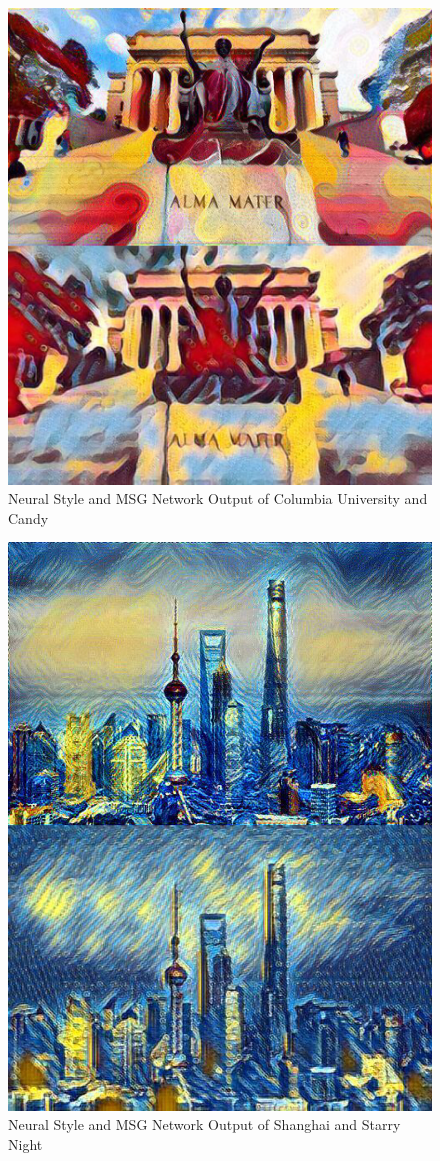 \documentclass[10pt,twocolumn,letterpaper]{article}
\begin{document}
\begin{figure}[t]
\begin{center}
\includegraphics[width=0.6\linewidth]{images/col_cmp.jpg}
\end{center}
\caption{Neural Style and MSG Network Output of Columbia University and Candy}
\label{fig:long}
\label{fig:onecol}
\label{fig_col_cmp}
\end{figure}

\begin{figure}[t]
\begin{center}
\includegraphics[width=0.6\linewidth]{images/shn_cmp.jpg}
\end{center}
\caption{Neural Style and MSG Network Output of Shanghai and Starry Night}
\label{fig:long}
\label{fig:onecol}
\label{fig_shn_cmp}
\end{figure}
\end{document}
